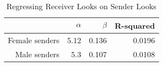 \begin{table}[ht]
\centering
\caption{Regressing Receiver Looks on Sender Looks} 
\label{tab:receiver_on_sender}
\begin{tabular}{rrrr}
  \hline
 & $\alpha$ & $\beta$ & R-squared \\ 
  \hline
Female senders & 5.12 & 0.136 & 0.0196 \\ 
  Male senders &  5.3 & 0.107 & 0.0108 \\ 
   \hline
\end{tabular}
\end{table}
